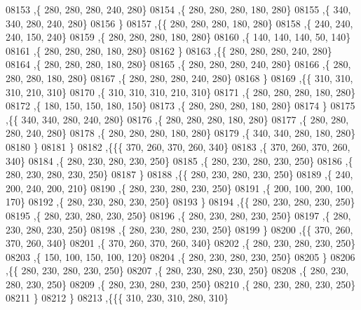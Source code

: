 \begin{DoxyCode}
08153     ,\{   280,   280,   280,   240,   280\}
08154     ,\{   280,   280,   280,   180,   280\}
08155     ,\{   340,   340,   280,   240,   280\}
08156     \}
08157    ,\{\{   280,   280,   280,   180,   280\}
08158     ,\{   240,   240,   240,   150,   240\}
08159     ,\{   280,   280,   280,   180,   280\}
08160     ,\{   140,   140,   140,    50,   140\}
08161     ,\{   280,   280,   280,   180,   280\}
08162     \}
08163    ,\{\{   280,   280,   280,   240,   280\}
08164     ,\{   280,   280,   280,   180,   280\}
08165     ,\{   280,   280,   280,   240,   280\}
08166     ,\{   280,   280,   280,   180,   280\}
08167     ,\{   280,   280,   280,   240,   280\}
08168     \}
08169    ,\{\{   310,   310,   310,   210,   310\}
08170     ,\{   310,   310,   310,   210,   310\}
08171     ,\{   280,   280,   280,   180,   280\}
08172     ,\{   180,   150,   150,   180,   150\}
08173     ,\{   280,   280,   280,   180,   280\}
08174     \}
08175    ,\{\{   340,   340,   280,   240,   280\}
08176     ,\{   280,   280,   280,   180,   280\}
08177     ,\{   280,   280,   280,   240,   280\}
08178     ,\{   280,   280,   280,   180,   280\}
08179     ,\{   340,   340,   280,   180,   280\}
08180     \}
08181    \}
08182   ,\{\{\{   370,   260,   370,   260,   340\}
08183     ,\{   370,   260,   370,   260,   340\}
08184     ,\{   280,   230,   280,   230,   250\}
08185     ,\{   280,   230,   280,   230,   250\}
08186     ,\{   280,   230,   280,   230,   250\}
08187     \}
08188    ,\{\{   280,   230,   280,   230,   250\}
08189     ,\{   240,   200,   240,   200,   210\}
08190     ,\{   280,   230,   280,   230,   250\}
08191     ,\{   200,   100,   200,   100,   170\}
08192     ,\{   280,   230,   280,   230,   250\}
08193     \}
08194    ,\{\{   280,   230,   280,   230,   250\}
08195     ,\{   280,   230,   280,   230,   250\}
08196     ,\{   280,   230,   280,   230,   250\}
08197     ,\{   280,   230,   280,   230,   250\}
08198     ,\{   280,   230,   280,   230,   250\}
08199     \}
08200    ,\{\{   370,   260,   370,   260,   340\}
08201     ,\{   370,   260,   370,   260,   340\}
08202     ,\{   280,   230,   280,   230,   250\}
08203     ,\{   150,   100,   150,   100,   120\}
08204     ,\{   280,   230,   280,   230,   250\}
08205     \}
08206    ,\{\{   280,   230,   280,   230,   250\}
08207     ,\{   280,   230,   280,   230,   250\}
08208     ,\{   280,   230,   280,   230,   250\}
08209     ,\{   280,   230,   280,   230,   250\}
08210     ,\{   280,   230,   280,   230,   250\}
08211     \}
08212    \}
08213   ,\{\{\{   310,   230,   310,   280,   310\}

\end{DoxyCode}
